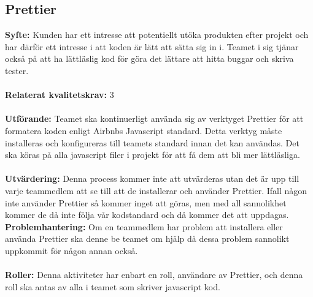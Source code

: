 \documentclass[10pt]{article}
\begin{document}
	
	
	\subsection{Prettier}
	\textbf{Syfte:}	Kunden har ett intresse att potentiellt utöka produkten efter projekt och har därför ett intresse i att koden är lätt att sätta sig in i. Teamet i sig tjänar också på att ha lättläslig kod för göra det lättare att hitta buggar och skriva tester.
	\\\\
	\textbf{Relaterat kvalitetskrav:} 3
	\\\\
	\textbf{Utförande:} Teamet ska kontinuerligt använda sig av verktyget Prettier för att formatera koden enligt Airbnbs Javascript standard\cite{bib-airbnb}. Detta verktyg måste installeras och konfigureras till teamets standard innan det kan användas. Det ska köras på alla javascript filer i projekt för att få dem att bli mer lättläsliga.
	\\\\
	\textbf{Utvärdering:} Denna process kommer inte att utvärderas utan det är upp till varje teammedlem att se till att de installerar och använder Prettier. Ifall någon inte använder Prettier så kommer inget att göras, men med all sannolikhet kommer de då inte följa vår kodstandard och då kommer det att uppdagas. 
	\textbf{Problemhantering:} Om en teammedlem har problem att installera eller använda Prettier ska denne be teamet om hjälp då dessa problem sannolikt uppkommit för någon annan också.
	\\\\
	\textbf{Roller:} Denna aktiviteter har enbart en roll, användare av Prettier, och denna roll ska antas av alla i teamet som skriver javascript kod.
	
	\label{git}
\end{document}
